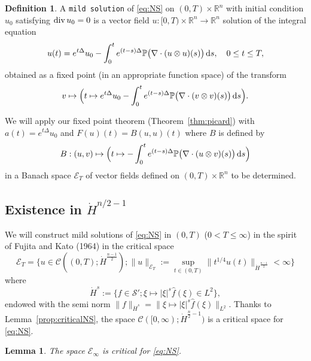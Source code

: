 \documentclass[a4paper, 12pt]{article}
\theoremstyle{plain}
\newtheorem{lemma}[proposition]{Lemma}
\theoremstyle{definition}
\newtheorem{definition}[proposition]{Definition}
\theoremstyle{remark}
\numberwithin{equation}{section}
\begin{document}
\begin{definition}
\label{def:defmild}
A {\tt mild solution} of \eqref{eq:NS} on $(0,T)\times{\mathds{R}}^n$ with initial condition $u_0$ 
satisfying ${\rm div}\,u_0=0$
is a vector field $u:[0,T)\times{\mathds{R}}^n\to{\mathds{R}}^n$ solution of the integral equation
%
\begin{equation}
\label{eq:intNS}
u(t)=e^{t\Delta}u_0-\int_0^te^{(t-s)\Delta}{\mathbb{P}}\bigl(\nabla\cdot(u\otimes u)(s)\bigr)\,{\rm d}s,
\quad 0\le t\le T,
\end{equation}
%
obtained as a fixed point (in an appropriate function space) of the transform
\[
v\mapsto \Bigl(t\mapsto 
e^{t\Delta}u_0-\int_0^te^{(t-s)\Delta}{\mathbb{P}}\bigl(\nabla\cdot(v\otimes v)(s)\bigr)\,{\rm d}s\Bigr).
\]
\end{definition}

We will apply our fixed point theorem (Theorem~\ref{thm:picard}) with $a(t)=e^{t\Delta}u_0$ and
$F(u)(t)=B(u,u)(t)$ where $B$ is defined by 
%
\begin{equation}
\label{eq:defB}
B:(u,v)\mapsto \Bigl(t\mapsto 
-\int_0^te^{(t-s)\Delta}{\mathbb{P}}\bigl(\nabla\cdot(u\otimes v)(s)\bigr)\,{\rm d}s\Bigr)
\end{equation}
%
in a Banach space ${\mathscr{E}}_T$ of vector fields defined on $(0,T)\times{\mathds{R}}^n$ to be
determined. 

\subsection{Existence in $\dot H^{n/2-1}$}
\label{subsec:mildSobolev}

We will construct mild solutions of \eqref{eq:NS} in $(0,T)$ ($0<T\le \infty$) in the spirit of Fujita and Kato (1964) 
\cite{FK64} in the
critical space 
\[
{\mathscr{E}}_T=
\bigl\{u\in {\mathscr{C}}((0,T);\dot H^{\frac{n-1}{2}}); 
\|u\|_{{\mathscr{E}}_T}:=\sup_{t\in(0,T)}\|t^{1/4}u(t)\|_{\dot H^{\frac{n-1}{2}}}<\infty\bigr\}  
\]
where
\[
\dot H^s:=\bigl\{f\in {\mathscr{S}}';\xi\mapsto |\xi|^s\hat f(\xi)\in  L^2\bigr\},
\]
endowed with the semi norm $\|f\|_{\dot H^s}=\|\xi\mapsto |\xi|^s\hat f(\xi)\|_{L^2}$.
Thanks to Lemma~\ref{prop:criticalNS}, the space ${\mathscr{C}}([0,\infty);\dot H^{\frac{n}{2}-1})$
is a critical space for \eqref{eq:NS}.

\begin{lemma}
The space ${\mathscr{E}}_\infty$ is critical for \eqref{eq:NS}.
\end{lemma}
\end{document}
